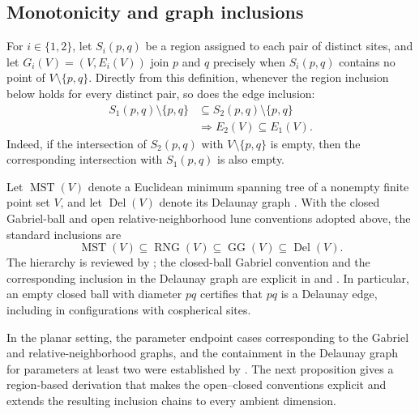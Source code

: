 \documentclass[a4paper,fleqn]{cas-dc}
\theoremstyle{definition}
\theoremstyle{remark}
\newcommand{\0}{\mathbf{0}}
\DeclareMathOperator{\RNG}{RNG}
\DeclareMathOperator{\GG}{GG}
\DeclareMathOperator{\Del}{Del}
\DeclareMathOperator{\MST}{MST}
\begin{document}
\subsection{Monotonicity and graph inclusions}
\label{sec:inclusions}

For $i\in\{1,2\}$, let $S_i(p,q)$ be a region assigned to each pair of
distinct sites, and let $G_i(V)=(V,E_i(V))$ join $p$ and $q$ precisely when
$S_i(p,q)$ contains no point of $V\setminus\{p,q\}$. Directly from this
definition, whenever the region inclusion below holds for every distinct pair,
so does the edge inclusion:
\begin{equation}
\begin{aligned}
S_1(p,q)\setminus\{p,q\}
&\subseteq
S_2(p,q)\setminus\{p,q\}
\\
&\Longrightarrow
E_2(V)\subseteq E_1(V).
\end{aligned}
\end{equation}
Indeed, if the intersection of $S_2(p,q)$ with
$V\setminus\{p,q\}$ is empty, then the corresponding intersection with
$S_1(p,q)$ is also empty.

Let $\MST(V)$ denote a Euclidean minimum spanning tree of a
nonempty finite point set $V$, and let $\Del(V)$ denote its Delaunay graph
\citep{mitchell2018}. With the closed Gabriel-ball and open
relative-neighborhood lune conventions adopted above, the standard
inclusions are
\begin{equation}
    \MST(V)\subseteq\RNG(V)\subseteq\GG(V)\subseteq\Del(V).
\end{equation}
The hierarchy is reviewed by \citet{jaromczyk1992relative}; the
closed-ball Gabriel convention and the corresponding inclusion in the Delaunay graph are explicit in
\citet{matula1980properties} and
\citet{cardinal2009empty}. 
In particular, an empty closed ball with diameter $pq$ 
certifies that $pq$ is a Delaunay edge, including in configurations 
with cospherical sites.


In the planar setting, the parameter endpoint cases corresponding to the Gabriel and relative-neighborhood graphs, and the containment in the Delaunay graph for parameters
at least two were established by
\citet[Theorems~3.3--3.5 and~3.11]{kannangara2018stepping}. The next
proposition gives a region-based derivation that makes the open--closed
conventions explicit and extends the resulting inclusion chains to every
ambient dimension.
\end{document}
